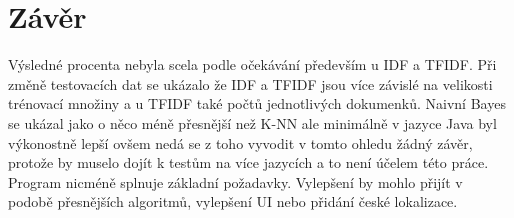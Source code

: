 \documentclass[a4paper,12pt]{article}
\begin{document}
\section{Závěr}

Výsledné procenta nebyla scela podle očekávání především u IDF a TFIDF. Při změně testovacích dat se ukázalo že IDF a TFIDF jsou více závislé na velikosti trénovací množiny a u TFIDF také počtů jednotlivých dokumenků. Naivní Bayes se ukázal jako o něco méně přesnější než K-NN ale minimálně v jazyce Java byl výkonostně lepší ovšem nedá se z toho vyvodit v tomto ohledu žádný závěr, protože by muselo dojít k testům na více jazycích a to není účelem této práce. Program nicméně splnuje základní požadavky. Vylepšení by mohlo přijít v podobě přesnějších algoritmů, vylepšení UI nebo přidání české lokalizace.
\end{document}
